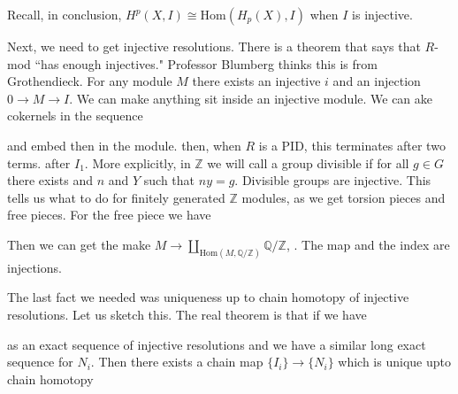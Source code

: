\documentclass[10pt]{article}
\theoremstyle{definition}
\begin{document}
	Recall, in conclusion, $H^p(X,I)\cong \text{Hom}(H_p(X),I)$ when $I$ is injective. 
	
	Next, we need to get injective resolutions. There is a theorem that says that $R$-mod ``has enough injectives." Professor Blumberg thinks this is from Grothendieck.  For any module $M$ there exists an injective $i$ and an injection $0\to M\to I$. We can make anything sit inside an injective module. We can ake cokernels in the sequence \begin{center}
		and embed then in the module. then, when $R$ is a PID, this terminates after two terms. after $I_1$. More explicitly, in $\mathbb{Z}$ we will call a group divisible if for all $g\in G$ there exists and $n$ and $Y$ such that $ny=g$. Divisible groups are injective. This tells us what to do for finitely generated $\mathbb{Z}$ modules, as we get torsion pieces and free pieces. For the free piece we have \begin{center}
		\end{center}
		Then we can get the make $M\to \coprod_{\text{Hom}(M,\mathbb{Q}/\mathbb{Z})}\mathbb{Q}/\mathbb{Z}$, . The map and the index are injections. \end{center}
	
	
	The last fact we needed was uniqueness up to chain homotopy of injective resolutions. Let us sketch this. The real theorem is that if we have \begin{center}
	\end{center}
	as an exact sequence of injective resolutions and we have a similar long exact sequence for $N_i$. Then there exists a chain map $\{I_i\}\to \{N_i\}$ which is unique upto chain homotopy
	
\end{document}
